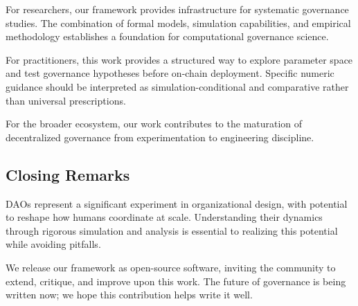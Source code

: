 For researchers, our framework provides infrastructure for systematic governance studies. The combination of formal models, simulation capabilities, and empirical methodology establishes a foundation for computational governance science.

For practitioners, this work provides a structured way to explore parameter space and test governance hypotheses before on-chain deployment. Specific numeric guidance should be interpreted as simulation-conditional and comparative rather than universal prescriptions.

For the broader ecosystem, our work contributes to the maturation of decentralized governance from experimentation to engineering discipline.

\subsection{Closing Remarks}

DAOs represent a significant experiment in organizational design, with potential to reshape how humans coordinate at scale. Understanding their dynamics through rigorous simulation and analysis is essential to realizing this potential while avoiding pitfalls.

We release our framework as open-source software, inviting the community to extend, critique, and improve upon this work. The future of governance is being written now; we hope this contribution helps write it well.

